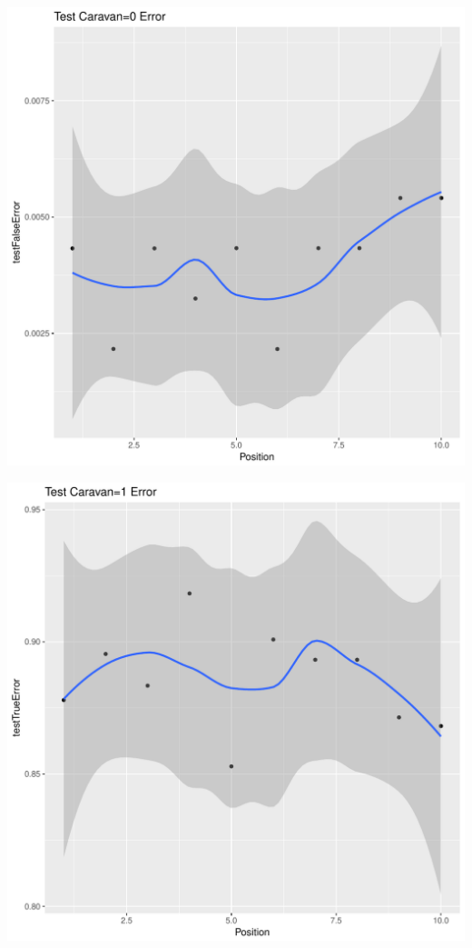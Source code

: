 \documentclass{article}\usepackage[]{graphicx}\usepackage[]{color}
\makeatletter
\def\maxwidth{ %
  \ifdim\Gin@nat@width>\linewidth
    \linewidth
  \else
    \Gin@nat@width
  \fi
}
\newenvironment{kframe}{%
 \def\at@end@of@kframe{}%
 \ifinner\ifhmode%
  \def\at@end@of@kframe{\end{minipage}}%
  \begin{minipage}{\columnwidth}%
 \fi\fi%
 \def\FrameCommand##1{\hskip\@totalleftmargin \hskip-\fboxsep
 \colorbox{shadecolor}{##1}\hskip-\fboxsep
     \hskip-\linewidth \hskip-\@totalleftmargin \hskip\columnwidth}%
 \MakeFramed {\advance\hsize-\width
   \@totalleftmargin\z@ \linewidth\hsize
   \@setminipage}}%
 {\par\unskip\endMakeFramed%
 \at@end@of@kframe}
\newenvironment{knitrout}{}{} %
\makeatother
\begin{document}
\begin{knitrout}
\begin{kframe}
{\ttfamily\noindent\itshape\color{messagecolor}{\#\# `geom\_smooth()` using method = 'loess'}}\end{kframe}
\includegraphics[width=\maxwidth]{figure/unnamed-chunk-31-6} 
\begin{kframe}

{\ttfamily\noindent\itshape\color{messagecolor}{\#\# `geom\_smooth()` using method = 'loess'}}\end{kframe}
\includegraphics[width=\maxwidth]{figure/unnamed-chunk-31-7} 
\begin{kframe}


\end{kframe}
\end{knitrout}
\end{document}
